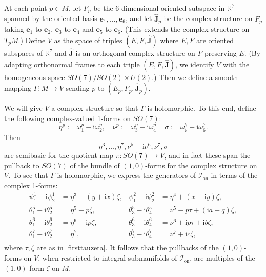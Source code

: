 \documentclass[12pt,reqno]{amsart}
\theoremstyle{definition}
\theoremstyle{remark}
\begin{document}
At each point $p\in M$, let $F_p$ be the 6-dimensional oriented subspace in ${\mathbb R}^7$
spanned by the oriented basis ${\mathbf e}_1, \ldots, {\mathbf e}_6$, and let ${\widehat{\mathbf J}}_p$ be
the complex structure on $F_p$ taking ${\mathbf e}_1$ to ${\mathbf e}_2$, ${\mathbf e}_3$ to ${\mathbf e}_4$
and ${\mathbf e}_5$ to ${\mathbf e}_6$.  (This extends the complex structure on $T_p M$.)
Define $V$ as the space of triples $(E,F,{\widehat{\mathbf J}})$ where $E,F$ are
oriented subspaces of ${\mathbb R}^7$ and ${\widehat{\mathbf J}}$ is an orthogonal complex
structure on $F$ preserving $E$.
(By adapting orthonormal frames to each triple $(E,F,{\widehat{\mathbf J}})$, we identify $V$ with the homogeneous space $SO(7)/SO(2)\times U(2)$.)
Then we define a smooth mapping $\Gamma:M\to V$ sending
$p$ to $(E_p, F_p, {\widehat{\mathbf J}}_p)$.

We will give $V$ a complex structure so that $\Gamma$ is holomorphic.
To this end, define the following complex-valued 1-forms on $SO(7)$:
$$\eta^p :={\omega}^p_1-{\mathrm i} {\omega}^p_2, \quad \nu^p := {\omega}^p_3 -{\mathrm i} {\omega}^p_4 \, \quad \sigma :={\omega}^7_5 - {\mathrm i} {\omega}^7_6.$$
Then
\begin{equation}\label{Vsemibasic}
\eta^3, \ldots, \eta^7, \nu^5-{\mathrm i} \nu^6, \nu^7, \sigma
\end{equation}
are semibasic for the quotient map $\pi:SO(7)\to V$, and in fact these
span the pullback to $SO(7)$ of the bundle of $(1,0)$-forms for the complex structure on $V$.
To see that $\Gamma$ is holomorphic, we express the generators of ${{{\mathcal I}}_{\operatorname{on}}}$ in terms
of the complex 1-forms:
\begin{equation}\label{Ioncomplex}
\begin{aligned}
\psi^1_1 -{\mathrm i} \psi^1_2 &= \eta^3 + (y+{\mathrm i} x)\zeta,  & \psi^2_1 -{\mathrm i} \psi^2_2 &= \eta^4 + (x-{\mathrm i} y)\zeta,\\
\theta^5_1 -{\mathrm i} \theta^5_2 &= \eta^5 -p\zeta, & 	\theta^5_3 -{\mathrm i} \theta^5_4 &= \nu^5 -p\tau +({\mathrm i} a-q)\zeta,\\
\theta^6_1 -{\mathrm i} \theta^6_2 &= \eta^6 +{\mathrm i} p \zeta, & \theta^6_3 -{\mathrm i} \theta^6_4 &=\nu^6 +{\mathrm i} p\tau +{\mathrm i} b \zeta,\\
\theta^7_1 -{\mathrm i} \theta^7_2 &= \eta^7, &  \theta^7_3 -{\mathrm i} \theta^7_4 &= \nu^7 +{\mathrm i} c \zeta,\\
\end{aligned}
\end{equation}
where $\tau, \zeta$ are as in \eqref{firsttauzeta}.  It follows that the pullbacks of the $(1,0)$-forms on $V$, when
restricted to integral submanifolds of ${{{\mathcal I}}_{\operatorname{on}}}$, are multiples of the $(1,0)$-form $\zeta$ on $M$.
\end{document}
